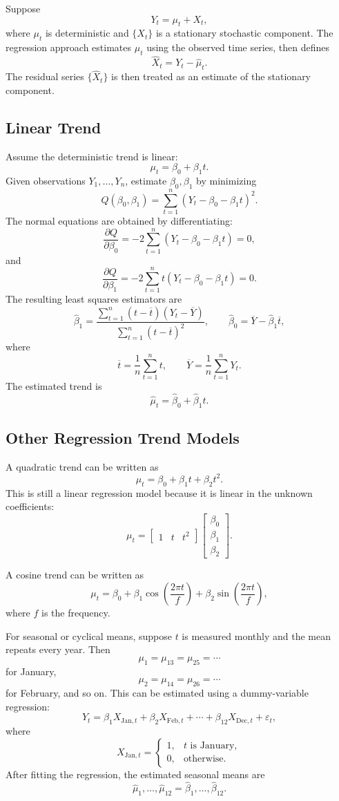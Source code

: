 \documentclass[12pt,oneside]{book}
\numberwithin{equation}{section}
\theoremstyle{definition}
\theoremstyle{plain}
\theoremstyle{remark}
\begin{document}
Suppose
\[
Y_t=\mu_t+X_t,
\]
where $\mu_t$ is deterministic and $\{X_t\}$ is a stationary stochastic component. The regression approach estimates $\mu_t$ using the observed time series, then defines
\[
\widehat{X}_t=Y_t-\widehat{\mu}_t.
\]
The residual series $\{\widehat{X}_t\}$ is then treated as an estimate of the stationary component.

\subsection{Linear Trend}

Assume the deterministic trend is linear:
\[
\mu_t=\beta_0+\beta_1t.
\]
Given observations $Y_1,\ldots,Y_n$, estimate $\beta_0,\beta_1$ by minimizing
\[
Q(\beta_0,\beta_1)
=
\sum_{t=1}^n(Y_t-\beta_0-\beta_1t)^2.
\]
The normal equations are obtained by differentiating:
\[
\frac{\partial Q}{\partial \beta_0}
=
-2\sum_{t=1}^n(Y_t-\beta_0-\beta_1t)=0,
\]
and
\[
\frac{\partial Q}{\partial \beta_1}
=
-2\sum_{t=1}^n t(Y_t-\beta_0-\beta_1t)=0.
\]
The resulting least squares estimators are
\[
\widehat{\beta}_1
=
\frac{\sum_{t=1}^n(t-\overline{t})(Y_t-\overline{Y})}
{\sum_{t=1}^n(t-\overline{t})^2},
\qquad
\widehat{\beta}_0
=
\overline{Y}-\widehat{\beta}_1\overline{t},
\]
where
\[
\overline{t}=\frac{1}{n}\sum_{t=1}^nt,
\qquad
\overline{Y}=\frac{1}{n}\sum_{t=1}^nY_t.
\]
The estimated trend is
\[
\widehat{\mu}_t=\widehat{\beta}_0+\widehat{\beta}_1t.
\]

\subsection{Other Regression Trend Models}

A quadratic trend can be written as
\[
\mu_t=\beta_0+\beta_1t+\beta_2t^2.
\]
This is still a linear regression model because it is linear in the unknown coefficients:
\[
\mu_t=
\begin{bmatrix}
1 & t & t^2
\end{bmatrix}
\begin{bmatrix}
\beta_0\\
\beta_1\\
\beta_2
\end{bmatrix}.
\]

A cosine trend can be written as
\[
\mu_t
=
\beta_0
+
\beta_1\cos\left(\frac{2\pi t}{f}\right)
+
\beta_2\sin\left(\frac{2\pi t}{f}\right),
\]
where $f$ is the frequency.

For seasonal or cyclical means, suppose $t$ is measured monthly and the mean repeats every year. Then
\[
\mu_1=\mu_{13}=\mu_{25}=\cdots
\]
for January,
\[
\mu_2=\mu_{14}=\mu_{26}=\cdots
\]
for February, and so on. This can be estimated using a dummy-variable regression:
\[
Y_t
=
\beta_1X_{\text{Jan},t}
+
\beta_2X_{\text{Feb},t}
+
\cdots
+
\beta_{12}X_{\text{Dec},t}
+
\varepsilon_t,
\]
where
\[
X_{\text{Jan},t}
=
\begin{cases}
1, & t \text{ is January},\\
0, & \text{otherwise}.
\end{cases}
\]
After fitting the regression, the estimated seasonal means are
\[
\widehat{\mu}_1,\ldots,\widehat{\mu}_{12}
=
\widehat{\beta}_1,\ldots,\widehat{\beta}_{12}.
\]
\end{document}
